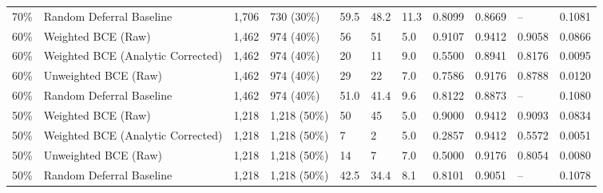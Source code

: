 \begin{tabular}{lllllllllll}
70\% & Random Deferral Baseline & 1,706 & 730 (30\%) & 59.5 & 48.2 & 11.3 & 0.8099 & 0.8669 & -- & 0.1081 \\
60\% & Weighted BCE (Raw) & 1,462 & 974 (40\%) & 56 & 51 & 5.0 & 0.9107 & 0.9412 & 0.9058 & 0.0866 \\
60\% & Weighted BCE (Analytic Corrected) & 1,462 & 974 (40\%) & 20 & 11 & 9.0 & 0.5500 & 0.8941 & 0.8176 & 0.0095 \\
60\% & Unweighted BCE (Raw) & 1,462 & 974 (40\%) & 29 & 22 & 7.0 & 0.7586 & 0.9176 & 0.8788 & 0.0120 \\
60\% & Random Deferral Baseline & 1,462 & 974 (40\%) & 51.0 & 41.4 & 9.6 & 0.8122 & 0.8873 & -- & 0.1080 \\
50\% & Weighted BCE (Raw) & 1,218 & 1,218 (50\%) & 50 & 45 & 5.0 & 0.9000 & 0.9412 & 0.9093 & 0.0834 \\
50\% & Weighted BCE (Analytic Corrected) & 1,218 & 1,218 (50\%) & 7 & 2 & 5.0 & 0.2857 & 0.9412 & 0.5572 & 0.0051 \\
50\% & Unweighted BCE (Raw) & 1,218 & 1,218 (50\%) & 14 & 7 & 7.0 & 0.5000 & 0.9176 & 0.8054 & 0.0080 \\
50\% & Random Deferral Baseline & 1,218 & 1,218 (50\%) & 42.5 & 34.4 & 8.1 & 0.8101 & 0.9051 & -- & 0.1078 \\
\bottomrule
\end{tabular}
